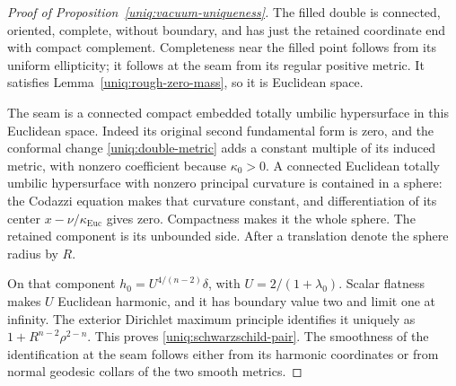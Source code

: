 \begin{proof}[Proof of Proposition~\ref{uniq:vacuum-uniqueness}]
The filled double is connected, oriented, complete, without
boundary, and has just the retained coordinate end with compact
complement. Completeness near the filled point follows from its
uniform ellipticity; it follows at the seam from its regular
positive metric. It satisfies Lemma~\ref{uniq:rough-zero-mass},
so it is Euclidean space.

The seam is a connected compact embedded totally umbilic
hypersurface in this Euclidean space. Indeed its original second
fundamental form is zero, and the conformal change
\eqref{uniq:double-metric} adds a constant multiple of its induced
metric, with nonzero coefficient because $\kappa_0>0$. A connected
Euclidean totally umbilic hypersurface with nonzero principal
curvature is contained in a sphere: the Codazzi equation makes
that curvature constant, and differentiation of its center
$x-\nu/\kappa_{\mathrm{Euc}}$ gives zero. Compactness makes it
the whole sphere. The retained component is its unbounded side.
After a translation denote the sphere radius by $R$.

On that component $h_0=U^{4/(n-2)}\delta$, with
$U=2/(1+\lambda_0)$. Scalar flatness makes $U$ Euclidean harmonic,
and it has boundary value two and limit one at infinity. The
exterior Dirichlet maximum principle identifies it uniquely as
$1+R^{n-2}\rho^{2-n}$. This proves
\eqref{uniq:schwarzschild-pair}. The smoothness of the identification
at the seam follows either from its harmonic coordinates or from
normal geodesic collars of the two smooth metrics.
\end{proof}
